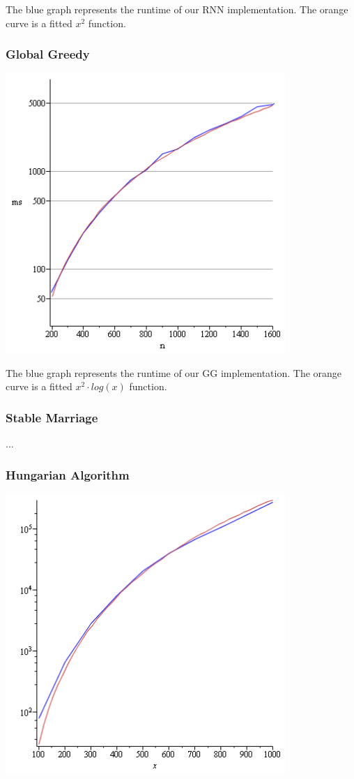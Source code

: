 \documentclass[a4paper,11pt]{article}
\begin{document}
The blue graph represents the runtime of our RNN implementation. The orange curve is a fitted $x^2$ function.

\subsubsection{Global Greedy}

\includegraphics[width=106mm]{GG_runtime.png}

The blue graph represents the runtime of our GG implementation. The orange curve is a fitted $x^2 \cdot log(x)$ function.

\subsubsection{Stable Marriage}

$\dots$

\subsubsection{Hungarian Algorithm}

\includegraphics[width=106mm]{HA_runtime.png}
\end{document}
